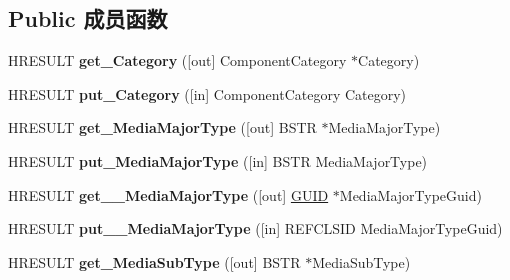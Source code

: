 \subsection*{Public 成员函数}
\begin{DoxyCompactItemize}
\item 
\mbox{\label{interface_i_component_type_af2b9a3ed40944a932307ce7e166faef3}} 
H\+R\+E\+S\+U\+LT {\bfseries get\+\_\+\+Category} (\mbox{[}out\mbox{]} Component\+Category $\ast$Category)
\item 
\mbox{\label{interface_i_component_type_a522a63ca3338ebaff6fc521ae5ac4bc7}} 
H\+R\+E\+S\+U\+LT {\bfseries put\+\_\+\+Category} (\mbox{[}in\mbox{]} Component\+Category Category)
\item 
\mbox{\label{interface_i_component_type_ab97b6e27838f942c3d9fa69ce1c1601c}} 
H\+R\+E\+S\+U\+LT {\bfseries get\+\_\+\+Media\+Major\+Type} (\mbox{[}out\mbox{]} B\+S\+TR $\ast$Media\+Major\+Type)
\item 
\mbox{\label{interface_i_component_type_a50f26484d7d22211e6695c6301e56922}} 
H\+R\+E\+S\+U\+LT {\bfseries put\+\_\+\+Media\+Major\+Type} (\mbox{[}in\mbox{]} B\+S\+TR Media\+Major\+Type)
\item 
\mbox{\label{interface_i_component_type_a519643ea328470e96e53f52d6a460136}} 
H\+R\+E\+S\+U\+LT {\bfseries get\+\_\+\+\_\+\+Media\+Major\+Type} (\mbox{[}out\mbox{]} \hyperlink{interface_g_u_i_d}{G\+U\+ID} $\ast$Media\+Major\+Type\+Guid)
\item 
\mbox{\label{interface_i_component_type_a0bdbc8d2ec3a72620eecf8b288b1780e}} 
H\+R\+E\+S\+U\+LT {\bfseries put\+\_\+\+\_\+\+Media\+Major\+Type} (\mbox{[}in\mbox{]} R\+E\+F\+C\+L\+S\+ID Media\+Major\+Type\+Guid)
\item 
\mbox{\label{interface_i_component_type_ac1220097d187eebcb3b259f7b424c437}} 
H\+R\+E\+S\+U\+LT {\bfseries get\+\_\+\+Media\+Sub\+Type} (\mbox{[}out\mbox{]} B\+S\+TR $\ast$Media\+Sub\+Type)
\item 
\mbox{\label{interface_i_component_type_a76c7e33c6da4e346c3da15c3180663e6}} 

\end{DoxyCompactItemize}
